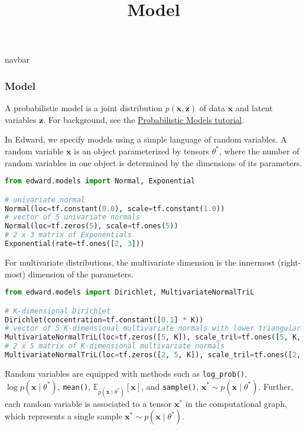 \title{Model}

{{navbar}}

\subsubsection{Model}

A probabilistic model is a joint distribution $p(\mathbf{x},
\mathbf{z})$ of data $\mathbf{x}$ and latent variables $\mathbf{z}$.
For background, see the \href{/tutorials/model}{Probabilistic Models tutorial}.

In Edward, we specify models using a simple language of random variables.
A random variable $\mathbf{x}$ is an object parameterized by
tensors $\theta^*$, where
the number of random variables in one object is determined by
the dimensions of its parameters.

\begin{lstlisting}[language=Python]
from edward.models import Normal, Exponential

# univariate normal
Normal(loc=tf.constant(0.0), scale=tf.constant(1.0))
# vector of 5 univariate normals
Normal(loc=tf.zeros(5), scale=tf.ones(5))
# 2 x 3 matrix of Exponentials
Exponential(rate=tf.ones([2, 3]))
\end{lstlisting}

For multivariate distributions, the multivariate dimension is the
innermost (right-most) dimension of the parameters.

\begin{lstlisting}[language=Python]
from edward.models import Dirichlet, MultivariateNormalTriL

# K-dimensional Dirichlet
Dirichlet(concentration=tf.constant([0.1] * K))
# vector of 5 K-dimensional multivariate normals with lower triangular cov
MultivariateNormalTriL(loc=tf.zeros([5, K]), scale_tril=tf.ones([5, K, K]))
# 2 x 5 matrix of K-dimensional multivariate normals
MultivariateNormalTriL(loc=tf.zeros([2, 5, K]), scale_tril=tf.ones([2, 5, K, K]))
\end{lstlisting}

Random variables are equipped with methods such as
\texttt{log_prob()}, $\log p(\mathbf{x}\mid\theta^*)$,
\texttt{mean()}, $\mathbb{E}_{p(\mathbf{x}\mid\theta^*)}[\mathbf{x}]$,
and \texttt{sample()}, $\mathbf{x}^*\sim p(\mathbf{x}\mid\theta^*)$.
Further, each random variable is associated to a tensor $\mathbf{x}^*$ in the
computational graph, which represents a single sample $\mathbf{x}^*\sim
p(\mathbf{x}\mid\theta^*)$.

